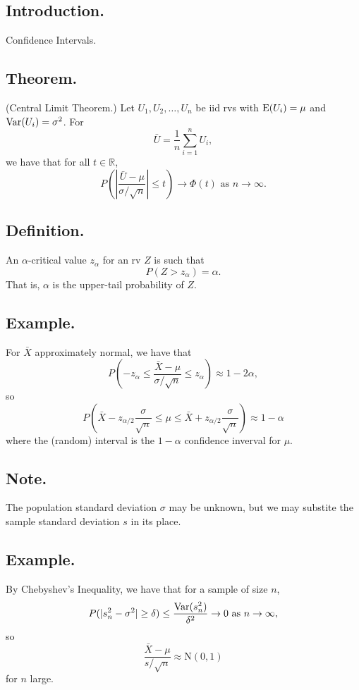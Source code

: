 \documentclass[titlepage]{article}
\begin{document}
\newpage {}

\subsection{Introduction.} Confidence Intervals.

\subsection{Theorem.} (Central Limit Theorem.) Let $U_{1}, U_{2}, \ldots, U_{n}$ be iid rvs with $\text{E}(U_{i}) = \mu$ and $\text{Var}(U_{i}) = \sigma^{2}$. For $$\bar{U} = \frac{1}{n}\sum_{i=1}^{n}U_{i},$$
we have that for all $t \in \mathbb{R}$,
$$P\left(\left|\frac{\bar{U} - \mu}{\sigma/\sqrt{n}}\right| \leq t\right) \rightarrow \Phi(t) \text{ as } n \rightarrow \infty.$$

\subsection{Definition.} An $\alpha$-critical value $z_{\alpha}$ for an rv $Z$ is such that 
$$P(Z > z_{\alpha}) = \alpha.$$
That is, $\alpha$ is the upper-tail probability of $Z$.

\subsection{Example.} For $\bar{X}$ approximately normal, we have that 
$$P\left(-z_{\alpha} \leq \frac{\bar{X} - \mu}{\sigma/\sqrt{n}} \leq z_{\alpha}\right) \approx 1 - 2\alpha,$$
so
$$P\left(\bar{X} - z_{\alpha/2}\frac{\sigma}{\sqrt{n}} \leq \mu \leq \bar{X} + z_{\alpha/2}\frac{\sigma}{\sqrt{n}}\right) \approx 1 - \alpha$$
where the (random) interval is the $1-\alpha$ confidence inverval for $\mu$.

\subsection{Note.} The population standard deviation $\sigma$ may be unknown, but we may substite the sample standard deviation $s$ in its place.

\subsection{Example.} By Chebyshev's Inequality, we have that for a sample of size $n$, 
$$P(|s_{n}^{2} - \sigma^{2}| \geq \delta) \leq \frac{\text{Var}(s_{n}^{2})}{\delta^{2}} \rightarrow 0 \text{ as } n \rightarrow \infty,$$
so 
$$\frac{\bar{X} - \mu}{s/\sqrt{n}} \approx \text{N}(0, 1)$$
for $n$ large.
\end{document}
